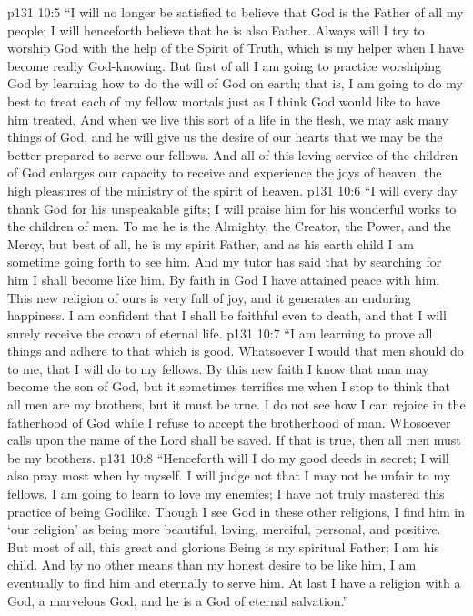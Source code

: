 \vs p131 10:5 “I will no longer be satisfied to believe that God is the Father of all my people; I will henceforth believe that he is also  Father. Always will I try to worship God with the help of the Spirit of Truth, which is my helper when I have become really God\hyp{}knowing. But first of all I am going to practice worshiping God by learning how to do the will of God on earth; that is, I am going to do my best to treat each of my fellow mortals just as I think God would like to have him treated. And when we live this sort of a life in the flesh, we may ask many things of God, and he will give us the desire of our hearts that we may be the better prepared to serve our fellows. And all of this loving service of the children of God enlarges our capacity to receive and experience the joys of heaven, the high pleasures of the ministry of the spirit of heaven.\plusone
\vs p131 10:6 “I will every day thank God for his unspeakable gifts; I will praise him for his wonderful works to the children of men. To me he is the Almighty, the Creator, the Power, and the Mercy, but best of all, he is my spirit Father, and as his earth child I am sometime going forth to see him. And my tutor has said that by searching for him I shall become like him. By faith in God I have attained peace with him. This new religion of ours is very full of joy, and it generates an enduring happiness. I am confident that I shall be faithful even to death, and that I will surely receive the crown of eternal life.
\vs p131 10:7 “I am learning to prove all things and adhere to that which is good. Whatsoever I would that men should do to me, that I will do to my fellows. By this new faith I know that man may become the son of God, but it sometimes terrifies me when I stop to think that all men are my brothers, but it must be true. I do not see how I can rejoice in the fatherhood of God while I refuse to accept the brotherhood of man. Whosoever calls upon the name of the Lord shall be saved. If that is true, then all men must be my brothers.
\vs p131 10:8 “Henceforth will I do my good deeds in secret; I will also pray most when by myself. I will judge not that I may not be unfair to my fellows. I am going to learn to love my enemies; I have not truly mastered this practice of being Godlike. Though I see God in these other religions, I find him in ‘our religion’ as being more beautiful, loving, merciful, personal, and positive. But most of all, this great and glorious Being is my spiritual Father; I am his child. And by no other means than my honest desire to be like him, I am eventually to find him and eternally to serve him. At last I have a religion with a God, a marvelous God, and he is a God of eternal salvation.”
